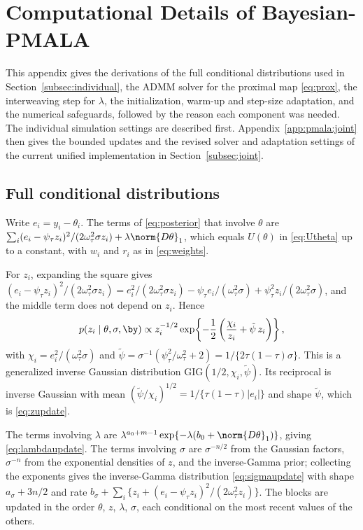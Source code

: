 \section{Computational Details of Bayesian-PMALA}
\label{app:pmala}

This appendix gives the derivations of the full conditional distributions used in Section~\ref{subsec:individual}, the ADMM solver for the proximal map \eqref{eq:prox}, the interweaving step for $\lambda$, the initialization, warm-up and step-size adaptation, and the numerical safeguards, followed by the reason each component was needed. The individual simulation settings are described first. Appendix~\ref{app:pmala:joint} then gives the bounded updates and the revised solver and adaptation settings of the current unified implementation in Section~\ref{subsec:joint}.

\subsection{Full conditional distributions}
\label{app:pmala:conditionals}

Write $e_i = y_i - \theta_i$. The terms of \eqref{eq:posterior} that involve $\theta$ are $\sum_i (e_i - \psi_\tau z_i)^2/(2\omega_\tau^2\sigma z_i) + \lambda\norm{D\theta}_1$, which equals $U(\theta)$ in \eqref{eq:Utheta} up to a constant, with $w_i$ and $r_i$ as in \eqref{eq:weights}.

For $z_i$, expanding the square gives $(e_i - \psi_\tau z_i)^2/(2\omega_\tau^2\sigma z_i) = e_i^2/(2\omega_\tau^2\sigma z_i) - \psi_\tau e_i/(\omega_\tau^2\sigma) + \psi_\tau^2 z_i/(2\omega_\tau^2\sigma)$, and the middle term does not depend on $z_i$. Hence
\[
p(z_i \mid \theta, \sigma, \by) \propto z_i^{-1/2} \exp\!\left\{-\frac{1}{2}\left(\frac{\chi_i}{z_i} + \tilde\psi\, z_i\right)\right\},
\]
with $\chi_i = e_i^2/(\omega_\tau^2 \sigma)$ and $\tilde\psi = \sigma^{-1}(\psi_\tau^2/\omega_\tau^2 + 2) = 1/\{2\tau(1-\tau)\sigma\}$. This is a generalized inverse Gaussian distribution $\mathrm{GIG}(1/2, \chi_i, \tilde\psi)$. Its reciprocal is inverse Gaussian with mean $(\tilde\psi/\chi_i)^{1/2} = 1/\{\tau(1-\tau)|e_i|\}$ and shape $\tilde\psi$, which is \eqref{eq:zupdate}.

The terms involving $\lambda$ are $\lambda^{a_0+m-1}\exp\{-\lambda(b_0 + \norm{D\theta}_1)\}$, giving \eqref{eq:lambdaupdate}. The terms involving $\sigma$ are $\sigma^{-n/2}$ from the Gaussian factors, $\sigma^{-n}$ from the exponential densities of $z$, and the inverse-Gamma prior; collecting the exponents gives the inverse-Gamma distribution \eqref{eq:sigmaupdate} with shape $a_\sigma + 3n/2$ and rate $b_\sigma + \sum_i\{z_i + (e_i - \psi_\tau z_i)^2/(2\omega_\tau^2 z_i)\}$. The blocks are updated in the order $\theta$, $z$, $\lambda$, $\sigma$, each conditional on the most recent values of the others.


